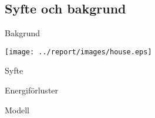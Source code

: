 \subsection{Syfte och bakgrund}

\begin{frame}{Bakgrund}

  \begin{center}
    \texttt{[image: ../report/images/house.eps]}
  \end{center}

\end{frame}

\begin{frame}{Syfte}

\begin{center}
\Huge{
Energiförluster

\vskip1.3cm

Modell
}
\end{center}


\end{frame}